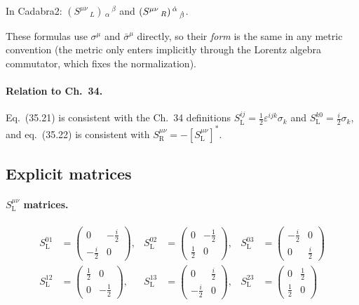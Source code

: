 In Cadabra2:
$(S^{\mu \nu}\,_{L})\,_{\alpha}\,^{\beta}$
and
$(S^{\mu \nu}\,_{R})\,^{\dot{\alpha}}\,_{\dot{\beta}}$.

These formulas use $\sigma^\mu$ and $\bar\sigma^\mu$ directly, so their
\emph{form} is the same in any metric convention (the metric only enters
implicitly through the Lorentz algebra commutator, which fixes the
normalization).

\paragraph{Relation to Ch.~34.}
Eq.~(35.21) is consistent with the Ch.~34 definitions
$S^{ij}_{\mathrm{L}} = \tfrac{1}{2}\varepsilon^{ijk}\sigma_k$
and $S^{k0}_{\mathrm{L}} = \tfrac{i}{2}\sigma_k$,
and eq.~(35.22) is consistent with
$S^{\mu\nu}_{\mathrm{R}} = -[S^{\mu\nu}_{\mathrm{L}}]^*$.

\subsection{Explicit matrices}

\paragraph{\texorpdfstring{$S^{\mu\nu}_{\mathrm{L}}$}{SL} matrices.}
\begin{align*}
  S^{01}_{\mathrm{L}} &= \begin{pmatrix}0 & -\tfrac{i}{2} \\ -\tfrac{i}{2} & 0\end{pmatrix},&
  S^{02}_{\mathrm{L}} &= \begin{pmatrix}0 & -\tfrac{1}{2} \\ \tfrac{1}{2} & 0\end{pmatrix},&
  S^{03}_{\mathrm{L}} &= \begin{pmatrix}-\tfrac{i}{2} & 0 \\ 0 & \tfrac{i}{2}\end{pmatrix}\\[6pt]
  S^{12}_{\mathrm{L}} &= \begin{pmatrix}\tfrac{1}{2} & 0 \\ 0 & -\tfrac{1}{2}\end{pmatrix},&
  S^{13}_{\mathrm{L}} &= \begin{pmatrix}0 & \tfrac{i}{2} \\ -\tfrac{i}{2} & 0\end{pmatrix},&
  S^{23}_{\mathrm{L}} &= \begin{pmatrix}0 & \tfrac{1}{2} \\ \tfrac{1}{2} & 0\end{pmatrix}
\end{align*}

